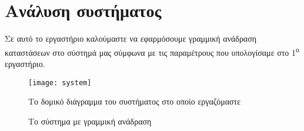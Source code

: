\section{Ανάλυση συστήματος}
Σε αυτό το εργαστήριο καλούμαστε να εφαρμόσουμε γραμμική ανάδραση καταστάσεων στο σύστημά μας σύμφωνα με τις παραμέτρους που υπολογίσαμε στο 1\textsuperscript{ο} εργαστήριο.

\makeatletter
\newcommand{\xRightarrow}[2][]{\ext@arrow 0359\Rightarrowfill@{#1}{#2}}
\makeatother
\newcommand\numberthis{\addtocounter{equation}{1}\tag{\theequation}}
\newcommand{\kone}{\frac{-k_m}{T_m s + 1}}
\newcommand{\ktwo}{k_{\mu}}
\newcommand{\kthree}{\frac{k_0}{s}}
\begin{figure}[htb]
    \centering
    \texttt{[image: system]}
    \caption{Το δομικό διάγραμμα του συστήματος στο οποίο εργαζόμαστε}
    \label{fig:system}
\end{figure}

\begin{figure}[htb]
    \centering
    
    \caption{Το σύστημα με γραμμική ανάδραση}\label{fig:system-feedback}
\end{figure}

